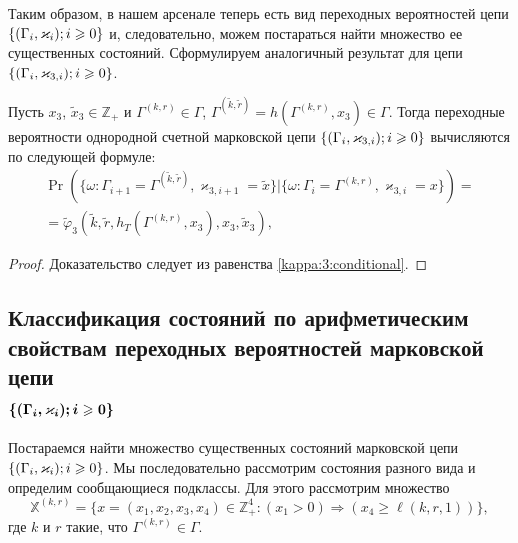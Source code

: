 \documentclass{report}
\newcommand{\Mark}{\{(\Gamma_i, \varkappa_i); \hm{} i \geqslant 0\}}
\newcommand{\MarkThree}{\{(\Gamma_i, \varkappa_{3,i}); \hm{} i \geqslant 0\}}
\begin{document}
Таким образом, в нашем арсенале теперь есть вид переходных вероятностей цепи $\Mark$ и, следовательно, можем постараться найти множество ее существенных состояний. Сформулируем аналогичный результат для цепи $\MarkThree$.
\begin{theorem}
Пусть $x_3$, $\tilde{x}_3\in \mathbb{Z}_+$ и $\Gamma^{(k,r)}\in \Gamma$, $\Gamma^{(\tilde{k},\tilde{r})}=h(\Gamma^{(k,r)},x_3) \in \Gamma$. Тогда переходные вероятности однородной счетной марковской цепи $\MarkThree$ вычисляются по следующей формуле:
\begin{multline}
\Pr (\{\omega\colon\Gamma_{i+1}=\Gamma^{(\tilde{k},\tilde{r})},\varkappa_{3,i+1}=\tilde{x}\}|\{\omega\colon\Gamma_{i}=\Gamma^{(k,r)},\varkappa_{3,i}=x\}) 
= \\ =\widetilde{\varphi}_3(\tilde{k},\tilde{r},h_T(\Gamma^{(k,r)},x_3),x_3,\tilde{x}_3),
\label{transitionToProve:three}
\end{multline}
\end{theorem}
\begin{proof}
Доказательство следует из равенства \eqref{kappa:3:conditional}.
\end{proof}



\subsection[Классификация состояний по арифметическим свойствам переходных вероятностей марковской цепи ${\Mark}$]%
{Классификация состояний по арифметическим \\ свойствам переходных вероятностей марковской цепи\\ $\boldsymbol{\Mark}$}
Постараемся найти множество существенных состояний марковской цепи $\Mark$. Мы последовательно рассмотрим состояния разного вида и определим сообщающиеся подклассы.   Для этого рассмотрим множество 
\begin{equation*}
{\mathbb X}^{(k,r)} = \{x = (x_1,x_2,x_3,x_4) \in \mathbb{Z}_+^4 \colon (x_1 > 0) \Rightarrow (x_4 \geqslant \ell(k,r,1))\},
\end{equation*}
где $k$ и $r$ такие, что $\Gamma^{(k,r)}\in \Gamma$. 
\end{document}
